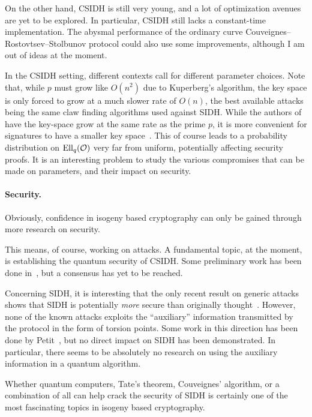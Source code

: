 \documentclass{report}
\theoremstyle{plain}
\theoremstyle{definition}
\begin{document}
On the other hand, CSIDH is still very young, and a lot of
optimization avenues are yet to be explored. %
In particular, CSIDH still lacks a constant-time implementation. %
The abysmal performance of the ordinary curve
Couveignes--Rostovtsev--Stolbunov protocol could also use some
improvements, although I am out of ideas at the moment.

In the CSIDH setting, different contexts call for different parameter
choices. %
Note that, while $p$ must grow like $O(n^2)$ due to Kuperberg's
algorithm, the key space is only forced to grow at a much slower rate
of $O(n)$, the best available attacks being the same claw finding
algorithms used against SIDH. %
While the authors of~\cite{cryptoeprint:2018:383} have the key-space
grow at the same rate as the prime $p$, it is more convenient for
signatures to have a smaller key space~\cite{cryptoeprint:2018:824}. %
This of course leads to a probability distribution on $\operatorname{Ell}_q(\mathcal{O})$
very far from uniform, potentially affecting security proofs. %
It is an interesting problem to study the various compromises that can
be made on parameters, and their impact on security.

\paragraph{Security.}
Obviously, confidence in isogeny based cryptography can only be gained
through more research on security. %

This means, of course, working on attacks. %
A fundamental topic, at the moment, is establishing the quantum
security of CSIDH. %
Some preliminary work has been done
in~\cite{BS18,BIJ18,Jao-etal-kuperberg-2018}, but a consensus has yet
to be reached. %

Concerning SIDH, it is interesting that the only recent result on
generic attacks shows that SIDH is potentially \emph{more} secure than
originally thought~\cite{cryptoeprint:2018:313}. %
However, none of the known attacks exploits the ``auxiliary''
information transmitted by the protocol in the form of torsion
points. %
Some work in this direction has been done by
Petit~\cite{10.1007/978-3-319-70697-9_12}, but no direct impact on
SIDH has been demonstrated. %
In particular, there seems to be absolutely no research on using the
auxiliary information in a quantum algorithm. %

Whether quantum computers, Tate's theorem, Couveignes' algorithm, or a
combination of all can help crack the security of SIDH is certainly
one of the most fascinating topics in isogeny based cryptography.
\end{document}
